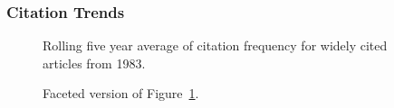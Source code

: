 \documentclass[
  10pt,
  letterpaper,
  DIV=11,
  numbers=noendperiod,
  twoside]{scrartcl}
\begin{document}
\subsubsection*{Citation Trends}\label{citation-trends-7}

\begin{figure}


\caption{\label{fig-citation-spaghetti-1983}Rolling five year average of
citation frequency for widely cited articles from 1983.}

\end{figure}%

\begin{figure}


\caption{\label{fig-citation-facet-1983}Faceted version of
Figure~\ref{fig-citation-spaghetti-1983}.}

\end{figure}%
\end{document}
